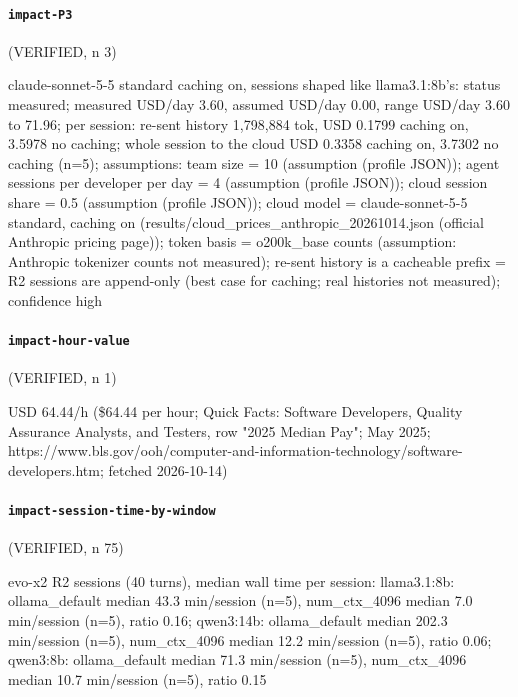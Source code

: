 \paragraph{\texttt{impact-P3}} (VERIFIED, n 3)

{\footnotesize\raggedright claude-sonnet-5-5 standard caching on, sessions shaped like llama3.1:8b's: status measured; measured USD/day 3.60, assumed USD/day 0.00, range USD/day 3.60 to 71.96; per session: re-sent history 1,798,884 tok, USD 0.1799 caching on, 3.5978 no caching; whole session to the cloud USD 0.3358 caching on, 3.7302 no caching (n=5); assumptions: team size = 10 (assumption (profile JSON)); agent sessions per developer per day = 4 (assumption (profile JSON)); cloud session share = 0.5 (assumption (profile JSON)); cloud model = claude-sonnet-5-5 standard, caching on (results/cloud\_prices\_anthropic\_20261014.json (official Anthropic pricing page)); token basis = o200k\_base counts (assumption: Anthropic tokenizer counts not measured); re-sent history is a cacheable prefix = R2 sessions are append-only (best case for caching; real histories not measured); confidence high\par}

\paragraph{\texttt{impact-hour-value}} (VERIFIED, n 1)

{\footnotesize\raggedright USD 64.44/h (\$64.44 per hour; Quick Facts: Software Developers, Quality Assurance Analysts, and Testers, row "2025 Median Pay"; May 2025; https://www.bls.gov/ooh/computer-and-information-technology/software-developers.htm; fetched 2026-10-14)\par}

\paragraph{\texttt{impact-session-time-by-window}} (VERIFIED, n 75)

{\footnotesize\raggedright evo-x2 R2 sessions (40 turns), median wall time per session: llama3.1:8b: ollama\_default median 43.3 min/session (n=5), num\_ctx\_4096 median 7.0 min/session (n=5), ratio 0.16; qwen3:14b: ollama\_default median 202.3 min/session (n=5), num\_ctx\_4096 median 12.2 min/session (n=5), ratio 0.06; qwen3:8b: ollama\_default median 71.3 min/session (n=5), num\_ctx\_4096 median 10.7 min/session (n=5), ratio 0.15\par}

